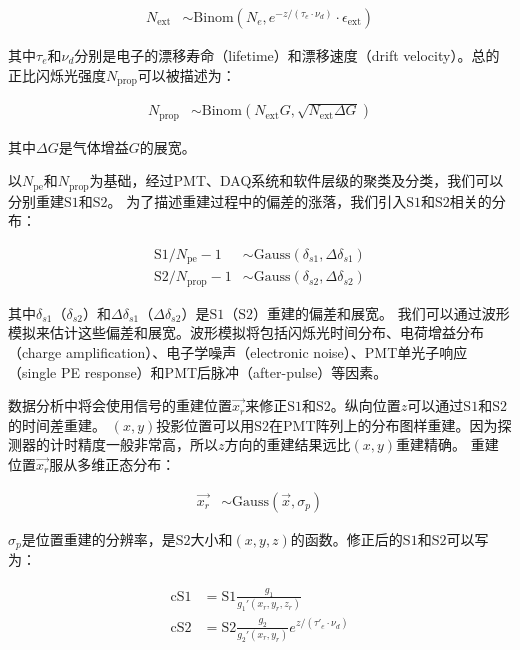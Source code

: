 \begin{align}
    \label{eq:N_ext}
    N_{\mathrm{ext}} &\sim \mathrm{Binom}\left(N_e,e^{-z/(\tau_e\cdot\nu_d)}\cdot\epsilon_{\mathrm{ext}}\right)
\end{align}

其中$\tau_e$和$\nu_d$分别是电子的漂移寿命（lifetime）和漂移速度（drift velocity）。总的正比闪烁光强度$N_{\mathrm{prop}}$可以被描述为：

\begin{align}
    \label{eq:N_prop}
    N_{\mathrm{prop}} &\sim \mathrm{Binom}\left(N_{\mathrm{ext}}G,\sqrt{N_{\mathrm{ext}}\Delta G}\right)
\end{align}

其中$\Delta G$是气体增益$G$的展宽。

以$N_{\mathrm{pe}}$和$N_{\mathrm{prop}}$为基础，经过PMT、DAQ系统和软件层级的聚类及分类，我们可以分别重建$\mathrm{S1}$和$\mathrm{S2}$。
为了描述重建过程中的偏差的涨落，我们引入$\mathrm{S1}$和$\mathrm{S2}$相关的分布：

\begin{align}
    \label{eq:s1s2}
    \mathrm{S1}/N_{\mathrm{pe}}-1 &\sim \mathrm{Gauss}\left(\delta_{s1},\Delta \delta_{s1}\right) \\
    \mathrm{S2}/N_{\mathrm{prop}}-1 &\sim \mathrm{Gauss}\left(\delta_{s2},\Delta \delta_{s2}\right)
\end{align}

其中$\delta_{s1}$（$\delta_{s2}$）和$\Delta \delta_{s1}$（$\Delta \delta_{s2}$）是$\mathrm{S1}$（$\mathrm{S2}$）重建的偏差和展宽。
我们可以通过波形模拟来估计这些偏差和展宽。波形模拟将包括闪烁光时间分布、电荷增益分布（charge amplification）、电子学噪声（electronic noise）、PMT单光子响应（single PE response）和PMT后脉冲（after-pulse）等因素。

数据分析中将会使用信号的重建位置$\vec{x_r}$来修正$\mathrm{S1}$和$\mathrm{S2}$。纵向位置$z$可以通过$\mathrm{S1}$和$\mathrm{S2}$的时间差重建。
$(x,y)$投影位置可以用$\mathrm{S2}$在PMT阵列上的分布图样重建。因为探测器的计时精度一般非常高，所以$z$方向的重建结果远比$(x,y)$重建精确。
重建位置$\vec{x_r}$服从多维正态分布：

\begin{align}
    \label{eq:x_r}
    \vec{x_r} &\sim \mathrm{Gauss}\left(\vec{x},\sigma_p\right)
\end{align}

$\sigma_p$是位置重建的分辨率，是$\mathrm{S2}$大小和$(x,y,z)$的函数。修正后的$\mathrm{S1}$和$\mathrm{S2}$可以写为：

\begin{align}
    \label{eq:cs1_cs2}
    \mathrm{cS1} &= \mathrm{S1}\frac{g_1}{g_1'(x_r,y_r,z_r)} \\
    \mathrm{cS2} &= \mathrm{S2}\frac{g_2}{g_2'(x_r,y_r)}e^{z/(\tau'_e\cdot\nu_d)}
\end{align}

